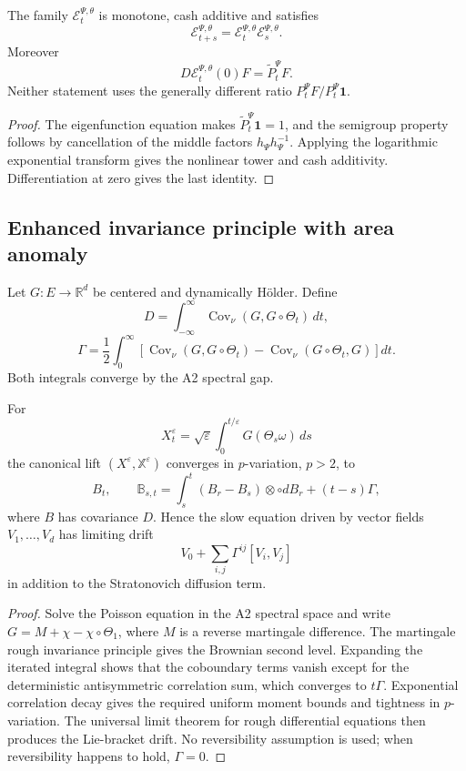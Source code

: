 \begin{theorem}
\label{thm:r5-a4-doob}
The family \(\mathcal E_t^{\Psi,\theta}\) is monotone, cash additive and
satisfies
\[
 \mathcal E_{t+s}^{\Psi,\theta}
 =\mathcal E_t^{\Psi,\theta}\mathcal E_s^{\Psi,\theta}.
\]
Moreover
\[
 D\mathcal E_t^{\Psi,\theta}(0)F
 =\widetilde P_t^\Psi F.
\]
Neither statement uses the generally different ratio
\(P_t^\Psi F/P_t^\Psi\mathbf1\).
\end{theorem}

\begin{proof}
The eigenfunction equation makes \(\widetilde P_t^\Psi\mathbf1=1\), and the
semigroup property follows by cancellation of the middle factors
\(h_\Psi h_\Psi^{-1}\).  Applying the logarithmic exponential transform gives
the nonlinear tower and cash additivity.  Differentiation at zero gives the
last identity.
\end{proof}

\subsection{Enhanced invariance principle with area anomaly}

Let \(G:E\to\mathbb R^d\) be centered and dynamically H\"older.  Define
\[
 D=\int_{-\infty}^{\infty}
 \operatorname{Cov}_\nu(G,G\circ\Theta_t)\,dt,
\]
\[
 \Gamma=\frac12\int_0^\infty
 \left[
  \operatorname{Cov}_\nu(G,G\circ\Theta_t)
 -\operatorname{Cov}_\nu(G\circ\Theta_t,G)
 \right]dt.
\]
Both integrals converge by the A2 spectral gap.

\begin{theorem}
\label{thm:r5-a4-rough}
For
\[
 X_t^\varepsilon=\sqrt\varepsilon
 \int_0^{t/\varepsilon}G(\Theta_s\omega)\,ds
\]
the canonical lift \((X^\varepsilon,\mathbb X^\varepsilon)\) converges in
\(p\)-variation, \(p>2\), to
\[
 B_t,\qquad
 \mathbb B_{s,t}=\int_s^t(B_r-B_s)\otimes\circ dB_r+(t-s)\Gamma,
\]
where \(B\) has covariance \(D\).  Hence the slow equation driven by vector
fields \(V_1,\ldots,V_d\) has limiting drift
\[
 V_0+\sum_{i,j}\Gamma^{ij}[V_i,V_j]
\]
in addition to the Stratonovich diffusion term.
\end{theorem}

\begin{proof}
Solve the Poisson equation in the A2 spectral space and write
\(G=M+\chi-\chi\circ\Theta_1\), where \(M\) is a reverse martingale
difference.  The martingale rough invariance principle gives the Brownian
second level.  Expanding the iterated integral shows that the coboundary terms
vanish except for the deterministic antisymmetric correlation sum, which
converges to \(t\Gamma\).  Exponential correlation decay gives the required
uniform moment bounds and tightness in \(p\)-variation.  The universal limit
theorem for rough differential equations then produces the Lie-bracket drift.
No reversibility assumption is used; when reversibility happens to hold,
\(\Gamma=0\).
\end{proof}

